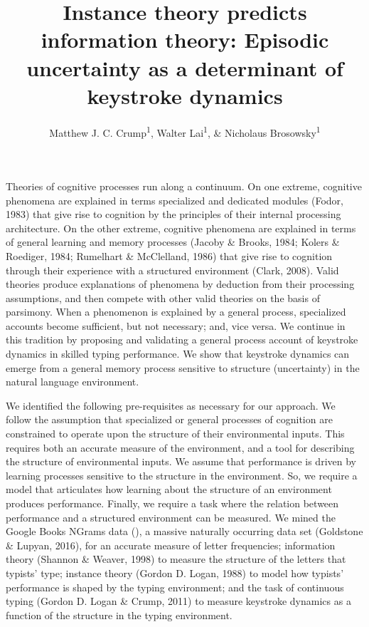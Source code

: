 \documentclass[floatsintext,man]{apa6}
\title{Instance theory predicts information theory: Episodic uncertainty as a
determinant of keystroke dynamics}
\author{Matthew J. C. Crump\textsuperscript{1}, Walter Lai\textsuperscript{1}, \& Nicholaus Brosowsky\textsuperscript{1}}
\affiliation{
    \vspace{0.5cm}
          \textsuperscript{1} Brooklyn College of the City University of New York  }
\theoremstyle{definition}
\theoremstyle{definition}
\theoremstyle{definition}
\theoremstyle{remark}
\begin{document}
\maketitle

\setcounter{secnumdepth}{0}



Theories of cognitive processes run along a continuum. On one extreme,
cognitive phenomena are explained in terms specialized and dedicated
modules (Fodor, 1983) that give rise to cognition by the principles of
their internal processing architecture. On the other extreme, cognitive
phenomena are explained in terms of general learning and memory
processes (Jacoby \& Brooks, 1984; Kolers \& Roediger, 1984; Rumelhart
\& McClelland, 1986) that give rise to cognition through their
experience with a structured environment (Clark, 2008). Valid theories
produce explanations of phenomena by deduction from their processing
assumptions, and then compete with other valid theories on the basis of
parsimony. When a phenomenon is explained by a general process,
specialized accounts become sufficient, but not necessary; and, vice
versa. We continue in this tradition by proposing and validating a
general process account of keystroke dynamics in skilled typing
performance. We show that keystroke dynamics can emerge from a general
memory process sensitive to structure (uncertainty) in the natural
language environment.

We identified the following pre-requisites as necessary for our
approach. We follow the assumption that specialized or general processes
of cognition are constrained to operate upon the structure of their
environmental inputs. This requires both an accurate measure of the
environment, and a tool for describing the structure of environmental
inputs. We assume that performance is driven by learning processes
sensitive to the structure in the environment. So, we require a model
that articulates how learning about the structure of an environment
produces performance. Finally, we require a task where the relation
between performance and a structured environment can be measured. We
mined the Google Books NGrams data (), a massive naturally occurring
data set (Goldstone \& Lupyan, 2016), for an accurate measure of letter
frequencies; information theory (Shannon \& Weaver, 1998) to measure the
structure of the letters that typists' type; instance theory (Gordon D.
Logan, 1988) to model how typists' performance is shaped by the typing
environment; and the task of continuous typing (Gordon D. Logan \&
Crump, 2011) to measure keystroke dynamics as a function of the
structure in the typing environment.
\end{document}
